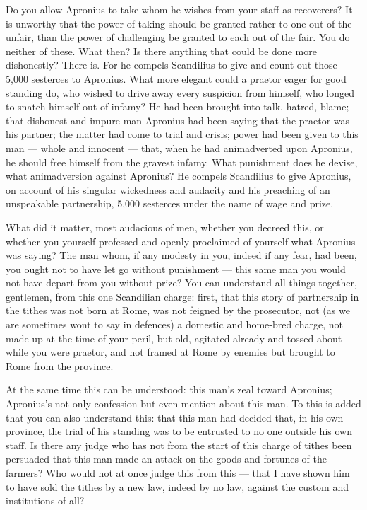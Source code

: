  Do you allow Apronius to take whom he wishes from your staff as recoverers? It is unworthy that the power of taking should be granted rather to one out of the unfair, than the power of challenging be granted to each out of the fair. You do neither of these. What then? Is there anything that could be done more dishonestly? There is. For he compels Scandilius to give and count out those 5,000 sesterces to Apronius. What more elegant could a praetor eager for good standing do, who wished to drive away every suspicion from himself, who longed to snatch himself out of infamy? He had been brought into talk, hatred, blame; that dishonest and impure man Apronius had been saying that the praetor was his partner; the matter had come to trial and crisis; power had been given to this man --- whole and innocent --- that, when he had animadverted upon Apronius, he should free himself from the gravest infamy. What punishment does he devise, what animadversion against Apronius? He compels Scandilius to give Apronius, on account of his singular wickedness and audacity and his preaching of an unspeakable partnership, 5,000 sesterces under the name of wage and prize.

 What did it matter, most audacious of men, whether you decreed this, or whether you yourself professed and openly proclaimed of yourself what Apronius was saying? The man whom, if any modesty in you, indeed if any fear, had been, you ought not to have let go without punishment --- this same man you would not have depart from you without prize? You can understand all things together, gentlemen, from this one Scandilian charge: first, that this story of partnership in the tithes was not born at Rome, was not feigned by the prosecutor, not (as we are sometimes wont to say in defences) a domestic and home-bred charge, not made up at the time of your peril, but old, agitated already and tossed about while you were praetor, and not framed at Rome by enemies but brought to Rome from the province.

 At the same time this can be understood: this man's zeal toward Apronius; Apronius's not only confession but even mention about this man. To this is added that you can also understand this: that this man had decided that, in his own province, the trial of his standing was to be entrusted to no one outside his own staff. Is there any judge who has not from the start of this charge of tithes been persuaded that this man made an attack on the goods and fortunes of the farmers? Who would not at once judge this from this --- that I have shown him to have sold the tithes by a new law, indeed by no law, against the custom and institutions of all?

